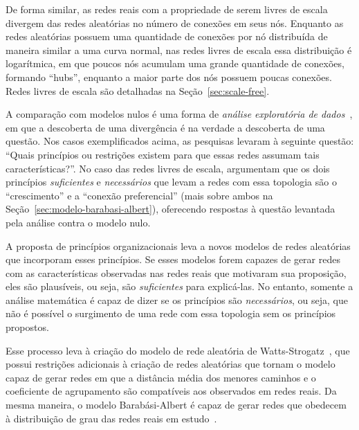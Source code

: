 \documentclass[12pt,a4paper]{article}
\theoremstyle{hypo}
\begin{document}

De forma similar, as redes reais com a propriedade de serem livres de escala divergem das redes aleatórias no número de conexões em seus nós. Enquanto as redes aleatórias possuem uma quantidade de conexões por nó distribuída de maneira similar a uma curva normal, nas redes livres de escala essa distribuição é logarítmica, em que poucos nós acumulam uma grande quantidade de conexões, formando \enquote{hubs}, enquanto a maior parte dos nós possuem poucas conexões. Redes livres de escala são detalhadas na Seção~\ref{sec:scale-free}.

A comparação com modelos nulos é uma forma de \textit{análise exploratória de dados}~\cite{Zweig2016-rb}, em que a descoberta de uma divergência é na verdade a descoberta de uma questão. Nos casos exemplificados acima, as pesquisas levaram à seguinte questão: \enquote{Quais princípios ou restrições existem para que essas redes assumam tais características?}. No caso das redes livres de escala,  argumentam que os dois princípios  \textit{suficientes} e \textit{necessários} que levam a redes com essa topologia são o \enquote{crescimento} e a \enquote{conexão preferencial} (mais sobre ambos na Seção~\ref{sec:modelo-barabasi-albert}), oferecendo respostas à questão levantada pela análise contra o modelo nulo.

A proposta de princípios organizacionais leva a novos modelos de redes aleatórias que incorporam esses princípios. Se esses modelos forem capazes de gerar redes com as características observadas nas redes reais que motivaram sua proposição, eles são plausíveis, ou seja, são \textit{suficientes} para explicá-las. No entanto, somente a análise matemática é capaz de dizer se os princípios são \textit{necessários}, ou seja, que não é possível o surgimento de uma rede com essa topologia sem os princípios propostos.

Esse processo leva à criação do modelo de rede aleatória de Watts-Strogatz~\cite{Watts1998-wt}, que possui restrições adicionais à criação de redes aleatórias que tornam o modelo capaz de gerar redes em que a distância média dos menores caminhos e o coeficiente de agrupamento são compatíveis aos observados em redes reais. Da mesma maneira, o modelo Barabási-Albert é capaz de gerar redes que obedecem à distribuição de grau das redes reais em estudo~\cite{Barabasi1999-sn}.
\end{document}
